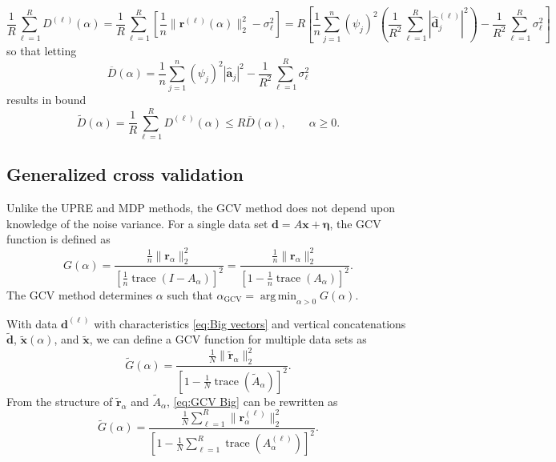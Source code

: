 \documentclass[12pt]{article}
\newcommand{\aVec}{\mathbf{a}}	%
\newcommand{\dVec}{\mathbf{d}}	%
\newcommand{\rVec}{\mathbf{r}}	%
\newcommand{\xVec}{\mathbf{x}}	%
\DeclareMathOperator{\trace}{trace}		%
\newcommand{\dft}[1]{\widehat{#1}}	%
\newcommand{\regparam}{\alpha}
\DeclareMathOperator*{\argmin}{arg\,min}
\newcommand{\mfilt}{\psi}
\newcommand{\noise}{\eta}	%
\newcommand{\noiseSD}{\sigma}	%
\newcommand{\noiseVec}{\bm{\noise}}	%
\newcommand{\regres}{\mathbf{r}_{\regparam}}	%
\newcommand{\A}{A_{\regparam}}	%
\newcommand{\G}{G}	%
\newcommand{\GCV}{\text{GCV}}	%
\newcommand{\D}{D}	%
\begin{document}
\[\frac{1}{R} \sum_{\ell=1}^R \D^{(\ell)}(\regparam) = \frac{1}{R}\sum_{\ell=1}^R \left[\frac{1}{n}\|\rVec^{(\ell)}(\regparam)\|_2^2 - \noiseSD_{\ell}^2\right] = R\left[\frac{1}{n}\sum_{j=1}^{n} \left(\mfilt_j\right)^2\left(\frac{1}{R^2} \sum_{\ell=1}^R |\dft{\dVec}_j^{(\ell)}|^2\right) - \frac{1}{R^2}\sum_{\ell=1}^R \noiseSD_{\ell}^2\right]\]
so that letting
\[\overline{\D}(\regparam) = \frac{1}{n}\sum_{j=1}^{n} \left(\mfilt_j\right)^2 |\dft{\aVec}_j|^2 - \frac{1}{R^2}\sum_{\ell=1}^R \noiseSD_{\ell}^2\]
results in bound
\begin{equation}
\label{eq:MDP Bound}
\widetilde{\D}(\regparam) = \frac{1}{R} \sum_{\ell=1}^R \D^{(\ell)}(\regparam) \leq R \overline{\D}(\regparam), \qquad \regparam \geq 0.
\end{equation}

\subsection{Generalized cross validation} \label{sec:GCV}
Unlike the UPRE and MDP methods, the GCV method does not depend upon knowledge of the noise variance. For a single data set $\dVec = A\xVec + \noiseVec$, the GCV function is defined as
\begin{equation}
\label{eq:GCV}
\G(\regparam) = \frac{\frac{1}{n}\|\regres\|_2^2}{\left[\frac{1}{n}\trace(I-\A)\right]^2} = \frac{\frac{1}{n}\|\regres\|_2^2}{\left[1 - \frac{1}{n}\trace(\A)\right]^2}.
\end{equation}
The GCV method determines $\regparam$ such that $\regparam_\GCV = \argmin_{\regparam > 0} \G(\regparam)$. \par 
With data $\dVec^{(\ell)}$ with characteristics \eqref{eq:Big vectors} and vertical concatenations $\widetilde{\dVec}$, $\widetilde{\xVec}(\regparam)$, and $\widetilde{\xVec}$, we can define a GCV function for multiple data sets as
\begin{equation}
\label{eq:GCV Big}
\widetilde{\G}(\regparam) = \frac{\frac{1}{N}\|\widetilde{\mathbf{r}}_\regparam\|_2^2}{\left[1 - \frac{1}{N}\trace(\widetilde{A}_\regparam)\right]^2}.
\end{equation}
From the structure of $\widetilde{\mathbf{r}}_\regparam$ and $\widetilde{A}_\regparam$, \eqref{eq:GCV Big} can be rewritten as
\begin{equation}
\label{eq:GCV Big 2}
\widetilde{\G}(\regparam) = \frac{\frac{1}{N}\sum_{\ell=1}^R \|\regres^{(\ell)}\|_2^2}{\left[1 - \frac{1}{N}\sum_{\ell=1}^R \trace\left(\A^{(\ell)}\right)\right]^2}.
\end{equation}
\end{document}
